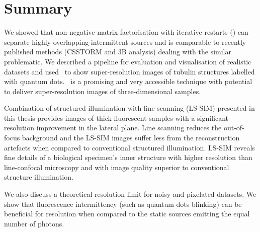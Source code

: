 \chapter{Summary}

We showed that non-negative matrix factorisation with iterative restarts (\inmf) can separate highly overlapping intermittent sources and is comparable to recently published methods (CSSTORM and 3B analysis) dealing with the similar problematic. We described a pipeline for evaluation and visualisation of realistic datasets and used \inmf\ to show super-resolution images of tubulin structures labelled with quantum dots. \inmf\ is a promising and very accessible technique with potential to deliver super-resolution images of three-dimensional samples.

Combination of structured illumination with line scanning (LS-SIM) presented in this thesis provides images of thick fluorescent samples with a significant resolution improvement in the lateral plane. Line scanning reduces the out-of-focus background and the LS-SIM images suffer less from the reconstruction artefacts when compared to conventional structured illumination. LS-SIM reveals fine details of a biological specimen's inner structure with higher resolution than line-confocal microscopy and with image quality superior to conventional structure illumination.

We also discuss a theoretical resolution limit for noisy and pixelated datasets. We show that fluorescence intermittency (such as quantum dots blinking) can be beneficial for resolution when compared to the static sources emitting the equal number of photons.